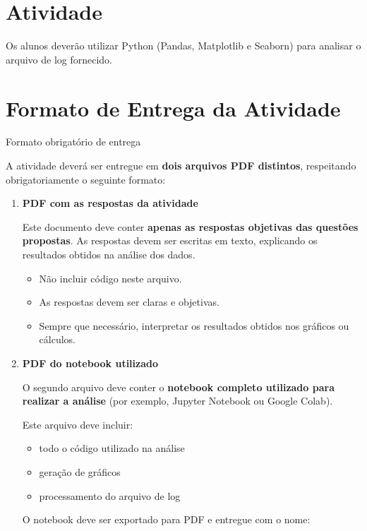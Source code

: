 \documentclass[12pt]{article}
\begin{document}
\section*{Atividade}

Os alunos deverão utilizar Python (Pandas, Matplotlib e Seaborn) para analisar o arquivo de log fornecido.
\section*{Formato de Entrega da Atividade}

\begin{block}{Formato obrigatório de entrega}

A atividade deverá ser entregue em \textbf{dois arquivos PDF distintos}, respeitando obrigatoriamente o seguinte formato:

\begin{enumerate}

\item \textbf{PDF com as respostas da atividade}

Este documento deve conter \textbf{apenas as respostas objetivas das questões propostas}.  
As respostas devem ser escritas em texto, explicando os resultados obtidos na análise dos dados.

\begin{itemize}
\item Não incluir código neste arquivo.
\item As respostas devem ser claras e objetivas.
\item Sempre que necessário, interpretar os resultados obtidos nos gráficos ou cálculos.
\end{itemize}

\item \textbf{PDF do notebook utilizado}

O segundo arquivo deve conter o \textbf{notebook completo utilizado para realizar a análise} (por exemplo, Jupyter Notebook ou Google Colab).

Este arquivo deve incluir:

\begin{itemize}
\item todo o código utilizado na análise
\item geração de gráficos
\item processamento do arquivo de log
\end{itemize}

O notebook deve ser exportado para PDF e entregue com o nome:


\end{enumerate}
\end{block}
\end{document}
